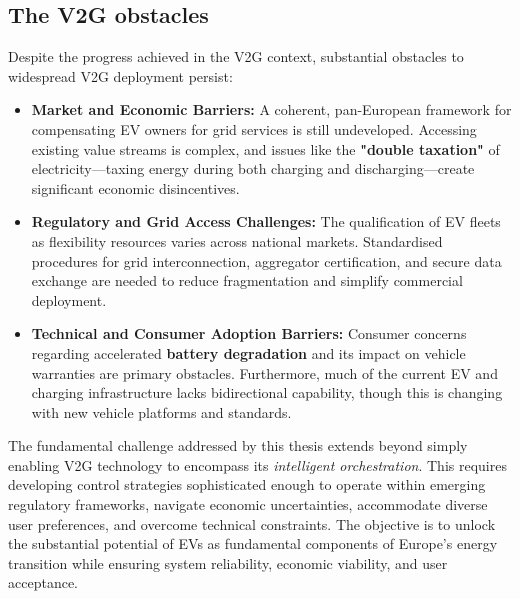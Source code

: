 \subsection{The V2G obstacles} 
Despite the progress achieved in the V2G context, substantial obstacles to widespread V2G deployment persist:

\begin{itemize}
    \item \textbf{Market and Economic Barriers:} A coherent, pan-European framework for compensating EV owners for grid services is still undeveloped. Accessing existing value streams is complex, and issues like the \textbf{"double taxation"} of electricity—taxing energy during both charging and discharging—create significant economic disincentives.
    
    \item \textbf{Regulatory and Grid Access Challenges:} The qualification of EV fleets as flexibility resources varies across national markets. Standardised procedures for grid interconnection, aggregator certification, and secure data exchange are needed to reduce fragmentation and simplify commercial deployment.
    
    \item \textbf{Technical and Consumer Adoption Barriers:} Consumer concerns regarding accelerated \textbf{battery degradation} and its impact on vehicle warranties are primary obstacles. Furthermore, much of the current EV and charging infrastructure lacks bidirectional capability, though this is changing with new vehicle platforms and standards.
\end{itemize}
\noindent
The fundamental challenge addressed by this thesis extends beyond simply enabling V2G technology to encompass its \textit{intelligent orchestration}. This requires developing control strategies sophisticated enough to operate within emerging regulatory frameworks, navigate economic uncertainties, accommodate diverse user preferences, and overcome technical constraints. The objective is to unlock the substantial potential of EVs as fundamental components of Europe's energy transition while ensuring system reliability, economic viability, and user acceptance.






